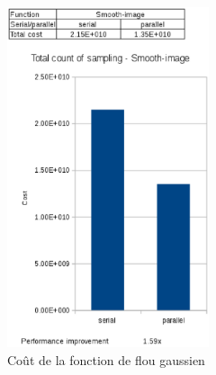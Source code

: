 \documentclass[10pt]{report}
\begin{document}
		\begin{figure}
			\includegraphics[height=10cm]{Reports/figures/smooth_image_costs.eps}
			\caption{Coût de la fonction de flou gaussien}
			\label{Coût de la fonction de flou gaussien}
		\end{figure}
\end{document}
